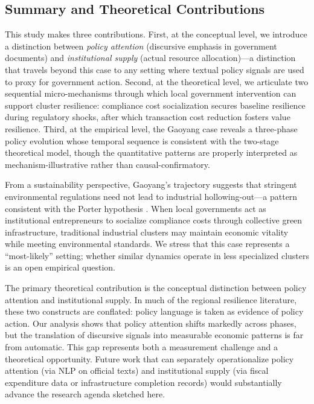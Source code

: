 \documentclass[a4paper, twoside, final]{article}
\begin{document}
\subsection{Summary and Theoretical Contributions}
This study makes three contributions. First, at the conceptual level, we introduce a distinction between \emph{policy attention} (discursive emphasis in government documents) and \emph{institutional supply} (actual resource allocation)---a distinction that travels beyond this case to any setting where textual policy signals are used to proxy for government action. Second, at the theoretical level, we articulate two sequential micro-mechanisms through which local government intervention can support cluster resilience: compliance cost socialization secures baseline resilience during regulatory shocks, after which transaction cost reduction fosters value resilience. Third, at the empirical level, the Gaoyang case reveals a three-phase policy evolution whose temporal sequence is consistent with the two-stage theoretical model, though the quantitative patterns are properly interpreted as mechanism-illustrative rather than causal-confirmatory.

From a sustainability perspective, Gaoyang's trajectory suggests that stringent environmental regulations need not lead to industrial hollowing-out---a pattern consistent with the Porter hypothesis \citep{Porter1995, Greenstone2012}. When local governments act as institutional entrepreneurs to socialize compliance costs through collective green infrastructure, traditional industrial clusters may maintain economic vitality while meeting environmental standards. We stress that this case represents a ``most-likely'' setting; whether similar dynamics operate in less specialized clusters is an open empirical question.

The primary theoretical contribution is the conceptual distinction between policy attention and institutional supply. In much of the regional resilience literature, these two constructs are conflated: policy language is taken as evidence of policy action. Our analysis shows that policy attention shifts markedly across phases, but the translation of discursive signals into measurable economic patterns is far from automatic. This gap represents both a measurement challenge and a theoretical opportunity. Future work that can separately operationalize policy attention (via NLP on official texts) and institutional supply (via fiscal expenditure data or infrastructure completion records) would substantially advance the research agenda sketched here.
\end{document}
